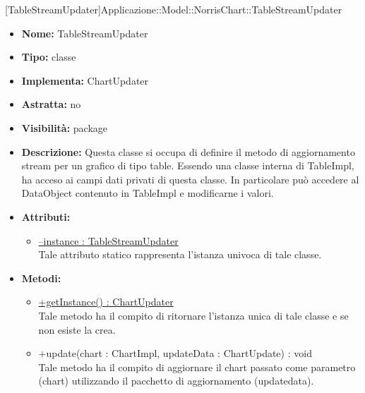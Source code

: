 			
			[TableStreamUpdater]{Applicazione::Model::NorrisChart::TableStreamUpdater}
			

	
			
			\begin{itemize}
			\item \textbf{Nome:} TableStreamUpdater
			\item \textbf{Tipo:} classe
			
		\item \textbf{Implementa:}
		ChartUpdater
		\item \textbf{Astratta:}
		no
			\item \textbf{Visibilità:} package
			\item \textbf{Descrizione:} Questa classe si occupa di definire il metodo di aggiornamento stream per un grafico di tipo table. Essendo una classe interna di TableImpl, ha acceso ai campi dati privati di questa classe. In particolare può accedere al DataObject contenuto in TableImpl e modificarne i valori.
			\item \textbf{Attributi:}
				\begin{itemize}
				\setlength{\itemsep}{5pt}
				
					\item[\ding{111}] \underline{--instance : TableStreamUpdater} \\ [1mm] Tale attributo statico rappresenta l'istanza univoca di tale classe.
				\end{itemize}
		
			\item \textbf{Metodi:}
				\begin{itemize}
				\setlength{\itemsep}{5pt}
				
					\item[\ding{111}] {\underline{+getInstance() : ChartUpdater}} \\ [1mm] Tale metodo ha il compito di ritornare l'istanza unica di tale classe e se non esiste la crea.
					\item[\ding{111}] {{+update(chart : ChartImpl, updateData : ChartUpdate) : void}} \\ [1mm] Tale metodo ha il compito di aggiornare il chart passato come parametro (chart) utilizzando il pacchetto di aggiornamento (updatedata).
				\end{itemize}
		
			\end{itemize}


